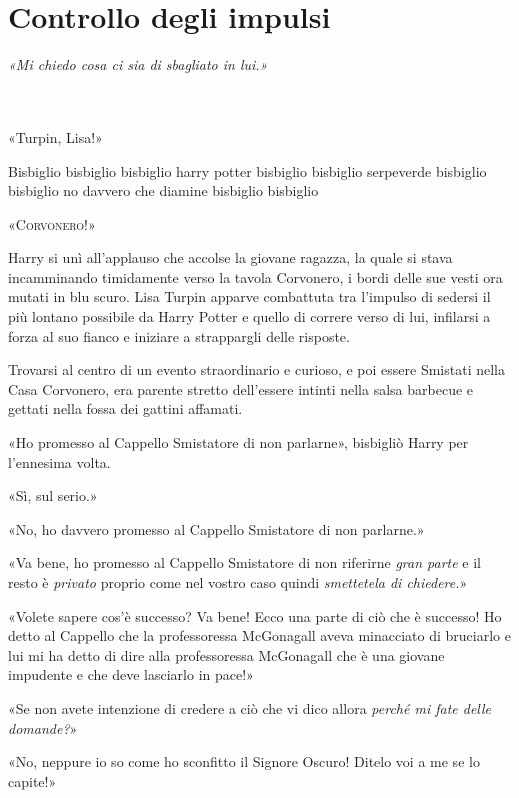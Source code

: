 
\chapter{Controllo degli impulsi}
\label{capitolo:12}

\emph{«Mi chiedo cosa ci sia di sbagliato in lui.»}

~\\
~\\

«Turpin, Lisa!»

Bisbiglio bisbiglio bisbiglio harry potter bisbiglio bisbiglio serpeverde bisbiglio bisbiglio no davvero che diamine bisbiglio bisbiglio

«\textsc{Corvonero!}»

Harry si unì all’applauso che accolse la giovane ragazza, la quale si stava incamminando timidamente verso la tavola Corvonero, i bordi delle sue vesti ora mutati in blu scuro. Lisa Turpin apparve combattuta tra l’impulso di sedersi il più lontano possibile da Harry Potter e quello di correre verso di lui, infilarsi a forza al suo fianco e iniziare a strappargli delle risposte.

Trovarsi al centro di un evento straordinario e curioso, e poi essere Smistati nella Casa Corvonero, era parente stretto dell’essere intinti nella salsa barbecue e gettati nella fossa dei gattini affamati.

«Ho promesso al Cappello Smistatore di non parlarne», bisbigliò Harry per l’ennesima volta.

«Sì, sul serio.»

«No, ho davvero promesso al Cappello Smistatore di non parlarne.»

«Va bene, ho promesso al Cappello Smistatore di non riferirne \textit{gran parte} e il resto è \textit{privato} proprio come nel vostro caso quindi \textit{smettetela di chiedere.}»

«Volete sapere cos’è successo? Va bene! Ecco una parte di ciò che è successo! Ho detto al Cappello che la professoressa McGonagall aveva minacciato di bruciarlo e lui mi ha detto di dire alla professoressa McGonagall che è una giovane impudente e che deve lasciarlo in pace!»

«Se non avete intenzione di credere a ciò che vi dico allora \textit{perché mi fate delle domande?}»

«No, neppure io so come ho sconfitto il Signore Oscuro! Ditelo voi a me se lo capite!»

